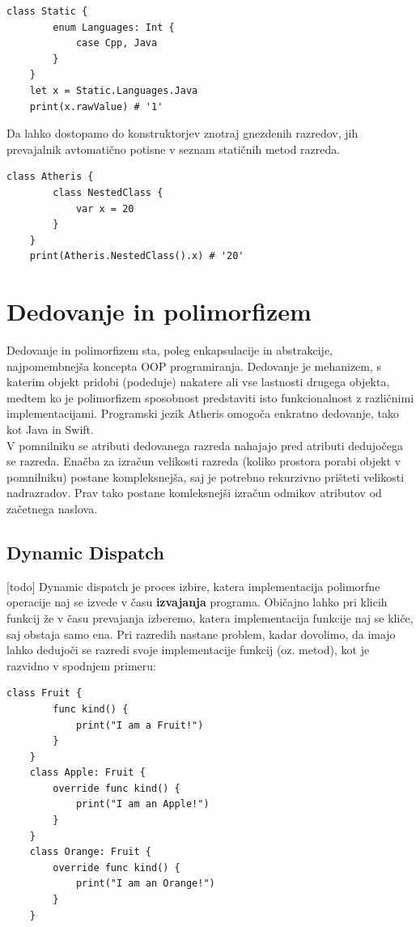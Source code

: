 \documentclass[a4paper, 12p]{book}
\begin{document}
\begin{lstlisting}[caption={Enumeracija znotraj razreda.}, captionpos=b]
	class Static {
	    enum Languages: Int {
	        case Cpp, Java
	    }
	}
	let x = Static.Languages.Java
	print(x.rawValue) # '1'
\end{lstlisting}

Da lahko dostopamo do konstruktorjev znotraj gnezdenih razredov, jih prevajalnik avtomatično potisne v seznam statičnih metod razreda.

\begin{lstlisting}[caption={Gnezden razred.}, captionpos=b]
	class Atheris {
	    class NestedClass {
	        var x = 20
	    }
	}
	print(Atheris.NestedClass().x) # '20'
\end{lstlisting}

\section{Dedovanje in polimorfizem}

Dedovanje in polimorfizem sta, poleg enkapsulacije in abstrakcije, najpomembnejša koncepta OOP programiranja. Dedovanje je mehanizem, s katerim objekt pridobi (podeduje) nakatere ali vse lastnosti drugega objekta, medtem ko je polimorfizem sposobnost predstaviti isto funkcionalnost z različnimi implementacijami. Programski jezik Atheris omogoča enkratno dedovanje, tako kot Java in Swift. \\
\indent V pomnilniku se atributi dedovanega razreda nahajajo pred atributi dedujočega se razreda. Enačba za izračun velikosti razreda (koliko prostora porabi objekt v pomnilniku) postane kompleksnejša, saj je potrebno rekurzivno prišteti velikosti nadrazradov. Prav tako postane komleksnejši izračun odmikov atributov od začetnega naslova. 

\subsection{Dynamic Dispatch} \label{dynamicDispatch}
[todo]
Dynamic dispatch je proces izbire, katera implementacija polimorfne operacije naj se izvede v času \textbf{izvajanja} programa. Običajno lahko pri klicih funkcij že v času prevajanja izberemo, katera implementacija funkcije naj se kliče, saj obstaja samo ena. Pri razredih nastane problem, kadar dovolimo, da imajo lahko dedujoči se razredi svoje implementacije funkcij (oz. metod), kot je razvidno v spodnjem primeru: 

\begin{lstlisting}[caption={Več implementacij za isto funkcionalnost.}, captionpos=b, label={virtualTableExamples}]
	class Fruit {
	    func kind() {
	        print("I am a Fruit!")
	    }
	}
	class Apple: Fruit {
	    override func kind() {
	        print("I am an Apple!")
	    }
	}
	class Orange: Fruit {
	    override func kind() {
	        print("I am an Orange!")
	    }
	}
\end{lstlisting}
\end{document}
